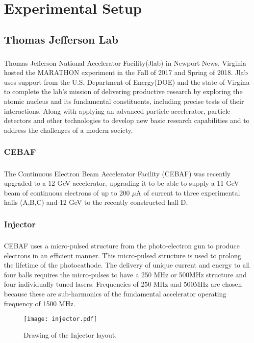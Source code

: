 


\chapter{ Experimental Setup} \label{ch:ExpUp}

\section{Thomas Jefferson Lab}
\paragraph{}Thomas Jefferson National Accelerator Facility(Jlab) in Newport News, Virginia hosted the MARATHON experiment in the Fall of 2017 and Spring of 2018. Jlab uses support from the U.S. Department of Energy(DOE) and the state of Virgina to complete the lab's mission of delivering productive research by exploring the atomic nucleus and its fundamental constituents, including precise tests of their interactions. Along with applying an advanced particle accelerator, particle detectors and other technologies to develop new basic research capabilities and to address the challenges of a modern society.
\subsection{CEBAF}\label{sec:cebaf}
	\paragraph{}The Continuous Electron Beam Accelerator Facility (CEBAF) was recently upgraded to a 12 GeV accelerator, upgrading it to be able to supply a 11 GeV beam of continuous electrons of up to 200 $\mu$A of current to three experimental halls (A,B,C) and 12 GeV to the recently constructed hall D. 
\subsection{Injector}
	\paragraph{} CEBAF uses a micro-pulsed structure from the photo-electron gun to produce electrons in an efficient manner. This micro-pulsed structure is used to prolong the lifetime of the photocathode. The delivery of unique current and energy to all four halls requires the micro-pulses to have a 250 MHz or 500MHz structure and four individually tuned lasers. Frequencies of 250 MHz and 500MHz are chosen because these are sub-harmonics of the fundamental accelerator operating frequency of 1500 MHz. 
	\begin{figure}[t]
	\centering
	\caption{Drawing of the Injector layout. }
	\label{fig:inj}
	\texttt{[image: injector.pdf]} 
	\end{figure} 
